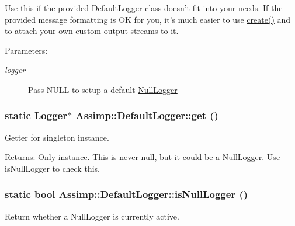 Use this if the provided DefaultLogger class doesn't fit into your needs. If the provided message formatting is OK for you, it's much easier to use \hyperlink{class_assimp_1_1_default_logger_dccb11f85f8b0ef226c382e11ba665c3}{create()} and to attach your own custom output streams to it. \begin{Desc}
\item[Parameters:]
\begin{description}
\item[{\em logger}]Pass NULL to setup a default \hyperlink{class_assimp_1_1_null_logger}{NullLogger} \end{description}
\end{Desc}
\hypertarget{class_assimp_1_1_default_logger_7d0a53f2db66945ade30094330a77ba4}{
\subsubsection[get]{\setlength{\rightskip}{0pt plus 5cm}static {\bf Logger}$\ast$ Assimp::DefaultLogger::get ()}}
\label{class_assimp_1_1_default_logger_7d0a53f2db66945ade30094330a77ba4}


Getter for singleton instance. 

\begin{Desc}
\item[Returns:]Only instance. This is never null, but it could be a \hyperlink{class_assimp_1_1_null_logger}{NullLogger}. Use isNullLogger to check this. \end{Desc}
\hypertarget{class_assimp_1_1_default_logger_bebc7ee702a2a2dde765e771948400c6}{
\subsubsection[isNullLogger]{\setlength{\rightskip}{0pt plus 5cm}static bool Assimp::DefaultLogger::isNullLogger ()}}
\label{class_assimp_1_1_default_logger_bebc7ee702a2a2dde765e771948400c6}


Return whether a NullLogger is currently active. 


